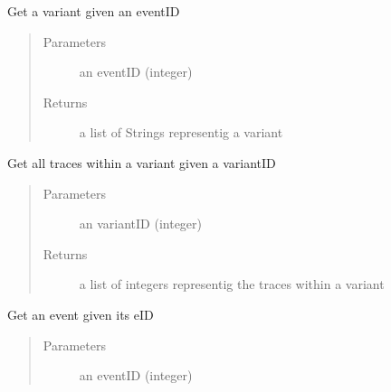 \documentclass[letterpaper,10pt,english]{sphinxmanual}
\begin{document}
\begin{fulllineitems}
\begin{fulllineitems}
\label{\detokenize{preprocessing:eventLogProcessing.DBTool.DBTool.getVariantByEventID}}
Get a variant given an eventID
\begin{quote}\begin{description}
\item[{Parameters}] \leavevmode
{} \textendash{} an eventID (integer)

\item[{Returns}] \leavevmode
a list of Strings representig a variant

\end{description}\end{quote}

\end{fulllineitems}


\begin{fulllineitems}
\label{\detokenize{preprocessing:eventLogProcessing.DBTool.DBTool.getTracesByVariantID}}
Get all traces within a variant given a variantID
\begin{quote}\begin{description}
\item[{Parameters}] \leavevmode
{} \textendash{} an variantID (integer)

\item[{Returns}] \leavevmode
a list of integers representig the traces within a variant

\end{description}\end{quote}

\end{fulllineitems}


\begin{fulllineitems}
\label{\detokenize{preprocessing:eventLogProcessing.DBTool.DBTool.getEventByID}}
Get an event given its eID
\begin{quote}\begin{description}
\item[{Parameters}] \leavevmode
{} \textendash{} an eventID (integer)


\end{description}
\end{quote}
\end{fulllineitems}
\end{fulllineitems}
\end{document}
